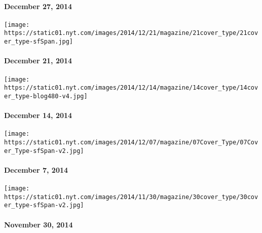 \hypertarget{december-27-2014}{%
\paragraph{December 27, 2014}\label{december-27-2014}}

\href{http://www.nytimes.com/indexes/2014/12/21/magazine/index.html}{}

\texttt{[image: https://static01.nyt.com/images/2014/12/21/magazine/21cover\_type/21cover\_type-sfSpan.jpg]}

\hypertarget{december-21-2014}{%
\paragraph{December 21, 2014}\label{december-21-2014}}

\href{http://www.nytimes.com/indexes/2014/12/14/magazine/index.html}{}

\texttt{[image: https://static01.nyt.com/images/2014/12/14/magazine/14cover\_type/14cover\_type-blog480-v4.jpg]}

\hypertarget{december-14-2014}{%
\paragraph{December 14, 2014}\label{december-14-2014}}

\href{http://www.nytimes.com/indexes/2014/12/07/magazine/index.html}{}

\texttt{[image: https://static01.nyt.com/images/2014/12/07/magazine/07Cover\_Type/07Cover\_Type-sfSpan-v2.jpg]}

\hypertarget{december-7-2014}{%
\paragraph{December 7, 2014}\label{december-7-2014}}

\href{http://www.nytimes.com/indexes/2014/11/30/magazine/index.html}{}

\texttt{[image: https://static01.nyt.com/images/2014/11/30/magazine/30cover\_type/30cover\_type-sfSpan-v2.jpg]}

\hypertarget{november-30-2014}{%
\paragraph{November 30, 2014}\label{november-30-2014}}

\href{http://www.nytimes.com/indexes/2014/11/23/magazine/index.html}{}

